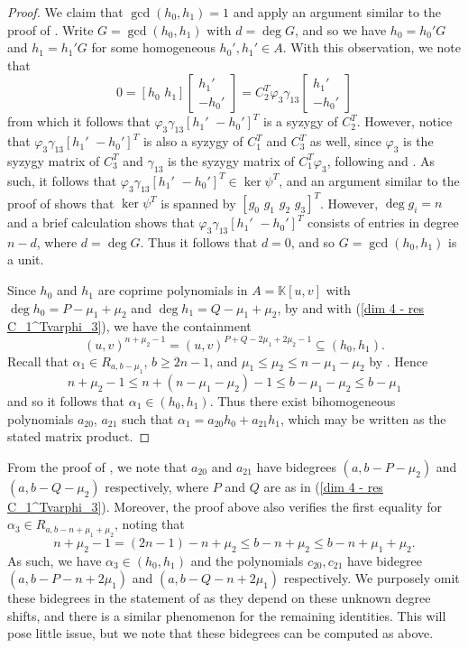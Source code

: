 \documentclass[reqno]{amsart}
\numberwithin{equation}{section}
\theoremstyle{definition}
\def\K{\mathbb{K}}
\begin{document}
\begin{proof}
We claim that $\gcd(h_0,h_1) = 1$ and apply an argument similar to the proof of . Write $G = \gcd(h_0,h_1)$ with $d= \deg G$, and so we have $h_0 = h_0'G$ and $h_1=h_1'G$ for some homogeneous $h_0',h_1'\in A$. With this observation, we note that 
$$ 0 = [h_0\,\,h_1]\begin{bmatrix}
    h_1'\\
    -h_0'
\end{bmatrix} = C_2^T \varphi_3\gamma_{13} \begin{bmatrix}
    h_1'\\
    -h_0'
\end{bmatrix}$$
from which it follows that $\varphi_3\gamma_{13}[h_1'\,\,-h_0']^T$ is a syzygy of $C_2^T$. However, notice that $\varphi_3\gamma_{13}[h_1'\,\,-h_0']^T$ is also a syzygy of $C_1^T$ and $C_3^T$ as well, since $\varphi_3$ is the syzygy matrix of $C_3^T$ and $\gamma_{13}$ is the syzygy matrix of $C_1^T\varphi_3$, following  and . As such, it follows that $\varphi_3\gamma_{13}[h_1'\,\,-h_0']^T \in \ker \psi^T$, and an argument similar to the proof of  shows that $\ker \psi^T$ is spanned by $[g_0\,\,g_1\,\,g_2\,\,g_3]^T$. However, $\deg g_i = n$ and a brief calculation shows that $\varphi_3\gamma_{13}[h_1'\,\,-h_0']^T$ consists of entries in degree $n-d$, where $d= \deg G$. Thus it follows that $d=0$, and so $G=\gcd(h_0,h_1)$ is a unit.

Since $h_0$ and $h_1$ are coprime polynomials in $A=\K[u,v]$ with $\deg h_0 = P-\mu_1+\mu_2$ and $\deg h_1 = Q-\mu_1+\mu_2$, by  and  with (\ref{dim 4 - res C_1^Tvarphi_3}), we have the containment
$$(u,v)^{n+\mu_2-1} = (u,v)^{P+Q-2\mu_1+2\mu_2-1} \subseteq (h_0,h_1).$$
Recall that $\alpha_1 \in R_{a,b-\mu_1}$, $b\geq 2n-1$, and $\mu_1\leq \mu_2 \leq n-\mu_1-\mu_2$ by . Hence 
$$n+\mu_2-1 \leq n+(n-\mu_1-\mu_2) -1 \leq b-\mu_1-\mu_2\leq b-\mu_1$$ 
and so it follows that $\alpha_1 \in (h_0,h_1)$. Thus there exist bihomogeneous polynomials $a_{20}$, $a_{21}$ such that $\alpha_1 = a_{20}h_0+a_{21}h_1$, which may be written as the stated matrix product.
\end{proof}



From the proof of , we note that $a_{20}$ and $a_{21}$ have bidegrees $(a,b-P-\mu_2)$ and $(a,b-Q-\mu_2)$ respectively, where $P$ and $Q$ are as in (\ref{dim 4 - res C_1^Tvarphi_3}). Moreover, the proof above also verifies the first equality for $\alpha_3\in R_{a,b-n+\mu_1+\mu_2}$, noting that 
$$n+\mu_2-1 = (2n-1)-n+\mu_2 \leq  b- n+\mu_2 \leq b-n+\mu_1+\mu_2.$$
As such, we have $\alpha_3 \in (h_0,h_1)$ and the polynomials $c_{20}, c_{21}$ have bidegree $(a,b-P-n+2\mu_1)$ and $(a,b-Q-n+2\mu_1)$ respectively. We purposely omit these bidegrees in the statement of  as they depend on these unknown degree shifts, and there is a similar phenomenon for the remaining identities. This will pose little issue, but we note that these bidegrees can be computed as above.
\end{document}
